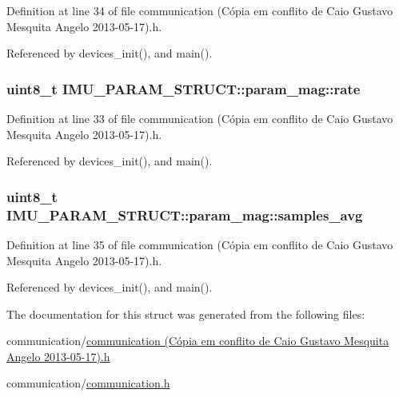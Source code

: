 Definition at line 34 of file communication (\-Cópia em conflito de Caio Gustavo Mesquita Angelo 2013-\/05-\/17).\-h.



Referenced by devices\-\_\-init(), and main().

\hypertarget{structIMU__PARAM__STRUCT_1_1param__mag_a234de95423b604b05b851ef90890cea1}{
\subsubsection[{rate}]{\setlength{\rightskip}{0pt plus 5cm}uint8\-\_\-t I\-M\-U\-\_\-\-P\-A\-R\-A\-M\-\_\-\-S\-T\-R\-U\-C\-T\-::param\-\_\-mag\-::rate}}\label{structIMU__PARAM__STRUCT_1_1param__mag_a234de95423b604b05b851ef90890cea1}


Definition at line 33 of file communication (\-Cópia em conflito de Caio Gustavo Mesquita Angelo 2013-\/05-\/17).\-h.



Referenced by devices\-\_\-init(), and main().

\hypertarget{structIMU__PARAM__STRUCT_1_1param__mag_a52c22cae6940eb39fb72aca66cfeba9a}{
\subsubsection[{samples\-\_\-avg}]{\setlength{\rightskip}{0pt plus 5cm}uint8\-\_\-t I\-M\-U\-\_\-\-P\-A\-R\-A\-M\-\_\-\-S\-T\-R\-U\-C\-T\-::param\-\_\-mag\-::samples\-\_\-avg}}\label{structIMU__PARAM__STRUCT_1_1param__mag_a52c22cae6940eb39fb72aca66cfeba9a}


Definition at line 35 of file communication (\-Cópia em conflito de Caio Gustavo Mesquita Angelo 2013-\/05-\/17).\-h.



Referenced by devices\-\_\-init(), and main().



The documentation for this struct was generated from the following files\-:\begin{DoxyCompactItemize}
\item 
communication/\hyperlink{communication_01_07C_xC3_xB3pia_01em_01conflito_01de_01Caio_01Gustavo_01Mesquita_01Angelo_012013-05-17_08_8h}{communication (\-Cópia em conflito de Caio Gustavo Mesquita Angelo 2013-\/05-\/17).\-h}\item 
communication/\hyperlink{communication_2communication_8h}{communication.\-h}\end{DoxyCompactItemize}
